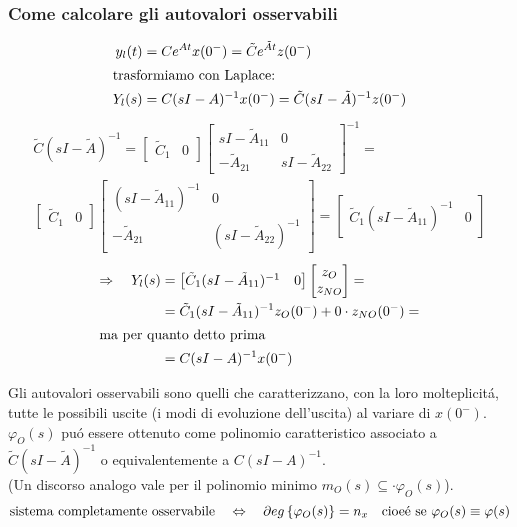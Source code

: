 \documentclass[../main.tex]{subfiles}
\begin{document}
	\subsubsection{Come calcolare gli autovalori osservabili}
		\begin{align*}
			y_l(t) &= C e^{At} x(0^{-}) = \tilde C e^{\tilde At} z(0^{-})\\
			\intertext{trasformiamo con Laplace:}
			Y_l(s) &= C(sI-A)^{-1}x(0^{-}) = \tilde C (sI-\tilde A)^{-1} z(0^{-})
		\end{align*}
		\begin{align*}
			\tilde C (sI-\tilde A)^{-1} =
			\begin{bmatrix}
				\tilde C_1 & 0
			\end{bmatrix}
			\begin{bmatrix}
				sI-\tilde A_{11} & 0\\
				-\tilde A_{21} & sI-\tilde A_{22}
			\end{bmatrix}^{-1} =
			\\
			\begin{bmatrix}
				\tilde C_1 & 0
			\end{bmatrix}
			\begin{bmatrix}
				(sI-\tilde A_{11})^{-1} & 0\\
				-\tilde A_{21} & (sI-\tilde A_{22})^{-1}
			\end{bmatrix} =
			\begin{bmatrix}
				\tilde C_1 (sI- \tilde A_{11})^{-1} & 0
			\end{bmatrix}
		\end{align*}
		\begin{align*}
			\Rightarrow\quad Y_l(s) &=
			\begin{bmatrix}
				\tilde C_1(sI-\tilde A_{11})^{-1} & 0
			\end{bmatrix}
			\begin{bmatrix}
				z_O\\
				z_{NO}
			\end{bmatrix} =
			\\
			&= \tilde C_1 (sI-\tilde A_{11})^{-1} z_O(0^{-}) + 0 \cdot z_{NO}(0^{-}) =
			\\
			\intertext{ma per quanto detto prima}
			&= C(sI-A)^{-1} x(0^{-})
		\end{align*}
		
		Gli autovalori osservabili sono quelli che caratterizzano, con la loro molteplicit\'a, tutte le possibili uscite (i modi di evoluzione dell'uscita) al variare di $ x(0^{-}) $. $ \varphi_O(s) $ pu\'o essere ottenuto come polinomio caratteristico associato a $ \tilde C (sI-\tilde A)^{-1} $ o equivalentemente a $ C(sI-A)^{-1} $.\\
		(Un discorso analogo vale per il polinomio minimo $ m_O(s) \subseteq \cdot \varphi_O(s) $).
		\[
			\text{sistema completamente osservabile} \quad\Leftrightarrow\quad \partial eg \left\lbrace \varphi_O(s) \right\rbrace = n_x \quad\text{cioe\'e se}\ \varphi_O(s) \equiv \varphi(s)
		\]
		
\end{document}
